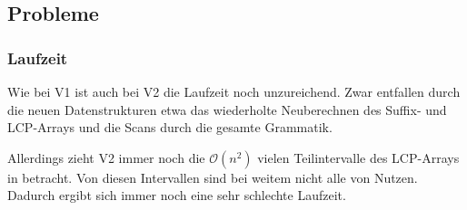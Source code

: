 \subsection{Probleme}

\subsubsection{Laufzeit}

Wie bei V1 ist auch bei V2 die Laufzeit noch unzureichend. Zwar entfallen durch die neuen Datenstrukturen etwa das wiederholte Neuberechnen des Suffix- und LCP-Arrays und die Scans durch die gesamte Grammatik.

Allerdings zieht V2 immer noch die $\mathcal{O}(n^2)$ vielen Teilintervalle des LCP-Arrays in betracht. Von diesen Intervallen sind bei weitem nicht alle von Nutzen. Dadurch ergibt sich immer noch eine sehr schlechte Laufzeit.
